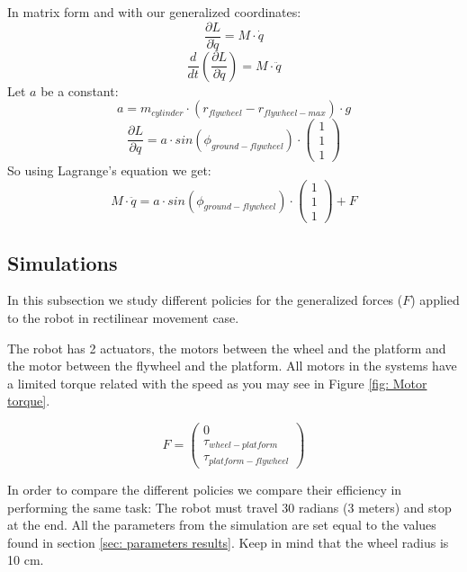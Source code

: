 In matrix form and with our generalized coordinates:
\begin{equation}
	\frac{\partial L}{\partial \dot{q}} =
	M \cdot \dot{q}
\end{equation}
\begin{equation}
	\frac{d}{dt}(\frac{\partial L}{\partial \dot{q}}) = 	M \cdot \ddot{q}
\end{equation}
Let $a$ be a constant:
\begin{equation}
	a = m_{cylinder}\cdot (r_{flywheel}-r_{flywheel-max}) \cdot g
\end{equation}
\begin{equation}
	\frac{\partial L}{\partial q} = a \cdot sin(\phi_{ground-flywheel}) \cdot
	\begin{pmatrix}
		1 \\ 1 \\ 1
	\end{pmatrix}
\end{equation}
So using Lagrange's equation we get:
\begin{equation}
	\boxed{
		M \cdot \ddot{q} = a \cdot sin(\phi_{ground-flywheel}) \cdot
		\begin{pmatrix}
			1 \\ 1 \\ 1
		\end{pmatrix} + F
	}
\end{equation}
\subsection{Simulations}
In this subsection we study different policies for the generalized forces
($F$) applied to the robot in rectilinear movement case.

The robot has 2 actuators, the motors between the wheel and the platform
and the motor between the flywheel and the platform.
All motors in the systems  have a limited torque related with the
speed as you may see in Figure \ref{fig: Motor torque}.

\begin{equation}
	\boxed{
		F =
		\begin{pmatrix}
			0 \\ \tau_{wheel-platform} \\ \tau_{platform-flywheel}
		\end{pmatrix}
	}
\end{equation}

In order to compare the different policies we compare their efficiency in performing the same task:
The robot must travel 30 radians (3 meters) and stop at the end. All the parameters from 
the simulation are set equal to the values found in section \ref{sec: parameters results}.
Keep in mind that the wheel radius is 10 cm.

